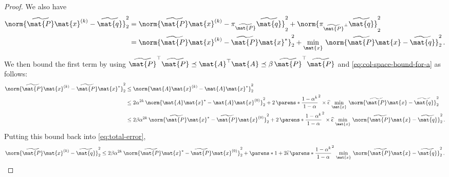 \begin{proof}
We also have
\begin{align}
\nonumber
\norm{\widetilde{\mat{P}} \mat{x}^{(k)}-\widetilde{\mat{q}}}_2^2 
&= \norm{\widetilde{\mat{P}} \mat{x}^{(k)} - \pi_{\widetilde{\mat{P}}}\widetilde{\mat{q}}}_2^2 + \norm{\pi_{\widetilde{\mat{P}}^\perp}\widetilde{\mat{q}}}_2^2
\\ & = 
\label{eq:total-error}
\norm{\widetilde{\mat{P}} \mat{x}^{(k)}-\widetilde{\mat{P}} \mat{x}^*}_2^2 + \min_{\mat{x}}\, \norm{\widetilde{\mat{P}} \mat{x} - \widetilde{\mat{q}}}_2^2\,.
\end{align}
We then bound the first term by using $\widetilde{\mat{P}}^\top \widetilde{\mat{P}} \preceq \mat{A}^\top \mat{A} \preceq \beta\, \widetilde{\mat{P}}^\top \widetilde{\mat{P}}$ and \eqref{eq:col-space-bound-for-a} as follows:
\begin{align}
    \nonumber
    \norm{\widetilde{\mat{P}} \mat{x}^{(k)}-\widetilde{\mat{P}} \mat{x}^*}_2^2 
    &\leq
    \norm{\mat{A} \mat{x}^{(k)}-\mat{A} \mat{x}^*}_2^2 \\
    &\leq
    \nonumber
    2\alpha^{2k}\, \norm{\mat{A} \mat{x}^{*} - \mat{A} \mat{x}^{(0)}}_2^2 + 2\, \parens*{\frac{1-\alpha^k}{1-\alpha}}^2 \times \widehat{\epsilon}\, \min_{\mat{x}}\, \norm{\widetilde{\mat{P}} \mat{x}-\widetilde{\mat{q}}}_2^2 \\
    &\leq 
    \nonumber%
    2 \beta\alpha^{2k}\, \norm{\widetilde{\mat{P}} \mat{x}^{*} - \widetilde{\mat{P}} \mat{x}^{(0)}}_2^2 + 2\, \parens*{\frac{1-\alpha^k}{1-\alpha}}^2 \times \widehat{\epsilon}\, \min_{\mat{x}}\, \norm{\widetilde{\mat{P}} \mat{x}-\widetilde{\mat{q}}}_2^2\,.
\end{align}
Putting this bound back into \eqref{eq:total-error},%
\[
\norm{\widetilde{\mat{P}} \mat{x}^{(k)}-\widetilde{\mat{q}}}_2^2 \leq 2 \beta\alpha^{2k}\, \norm{\widetilde{\mat{P}} \mat{x}^{*} - \widetilde{\mat{P}} \mat{x}^{(0)}}_2^2 + \parens*{1 + 2\widehat{\epsilon}\, \parens*{\frac{1-\alpha^k}{1-\alpha}}^2}\, \min_{\mat{x}}\, \norm{\widetilde{\mat{P}} \mat{x}-\widetilde{\mat{q}}}_2^2\,.
\]


\end{proof}
